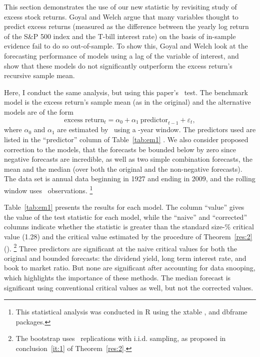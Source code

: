\documentclass[12pt,fleqn]{article}
\begin{document}
This section demonstrates the use of our new statistic by revisiting
 study of excess stock returns.  Goyal and Welch argue
that many variables thought to predict excess returns (measured as the
difference between the yearly log return of the S\&P 500 index and the
T-bill interest rate) on the basis of in-sample evidence fail to do so
out-of-sample.  To show this, Goyal and Welch look at the forecasting
performance of models using a lag of the variable of interest, and
show that these models do not significantly outperform the excess
return's recursive sample mean.

Here, I conduct the same analysis, but using this paper's \mds\ test.
The benchmark model is the excess return's sample mean (as in the
original) and the alternative models are of the form
\[\text{excess return}_{t} = \alpha_{0} + \alpha_{1}\
\text{predictor}_{t-1} + \varepsilon_{t},\] where $\alpha_{0}$ and
$\alpha_{1}$ are estimated by \ols\ using a \windowlength-year window.
The predictors used are listed in the ``predictor'' column of
Table~\ref{tab:em1} \citep[see][for a detailed description of the
variables]{GoW:08}.  We also consider \citepos{CaT:08} proposed
correction to the models, that the forecasts be bounded below by zero
since negative forecasts are incredible, as well as two simple
combination forecasts, the mean and the median (over both the original
and the non-negative forecasts).  The data set is annual data
beginning in 1927 and ending in 2009, and the rolling window uses
\windowlength\ observations.%
\footnote{This statistical analysis was
  conducted in R \citep{R} using the xtable
  \citep[version~1.6-0]{Dah:09}, and dbframe \citep[version
  0.2.7]{Cal:10b} packages.} %

Table~\ref{tab:em1} presents the results for each model.  The column
``value'' gives the value of the test statistic for each model, while
the ``naive'' and ``corrected'' columns indicate whether the statistic
is greater than the standard size-\bootsize\% critical value (1.28)
and the critical value estimated by the procedure of
Theorem~\ref{res:2} (\empiricalcriticalvalue).%
\footnote{The bootstrap
  uses \nboot\ replications with i.i.d. sampling, as proposed in
  conclusion~\ref{it:1} of Theorem~\ref{res:2}.} %
Three predictors are
significant at the naive critical values for both the original and
bounded forecasts: the dividend yield, long term interest rate, and
book to market ratio.  But none are significant after accounting for
data snooping, which highlights the importance of these methods.  The
median forecast is significant using conventional critical values as
well, but not the corrected values.
\end{document}
